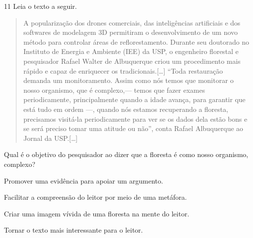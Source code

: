 \num{11} Leia o texto a seguir.

\begin{quote}
\noindent A popularização dos drones comerciais, das inteligências artificiais e
dos softwares de modelagem 3D permitiram o desenvolvimento de um novo
método para controlar áreas de reflorestamento. Durante seu doutorado no
Instituto de Energia e Ambiente (IEE) da USP, o engenheiro florestal e
pesquisador Rafael Walter de Albuquerque criou um procedimento mais
rápido e capaz de enriquecer os tradicionais.{[}\ldots{}{]} ``Toda
restauração demanda um monitoramento. Assim como nós temos que monitorar
o nosso organismo, que é complexo,— temos que fazer exames
periodicamente, principalmente quando a idade avança, para garantir que
está tudo em ordem —, quando nós estamos recuperando a floresta,
precisamos visitá-la periodicamente para ver se os dados dela estão bons
e se será preciso tomar uma atitude ou não'', conta Rafael Albuquerque
ao Jornal da USP.{[}\ldots{}{]}

\end{quote}

\noindent Qual é o objetivo do pesquisador ao dizer que a floresta é como nosso
organismo, complexo?

\begin{escolha}
\item Promover uma evidência para apoiar um argumento.
\item Facilitar a compreensão do leitor por meio de uma metáfora.
\item Criar uma imagem vívida de uma floresta na mente do leitor.
\item Tornar o texto mais interessante para o leitor.
\end{escolha}



